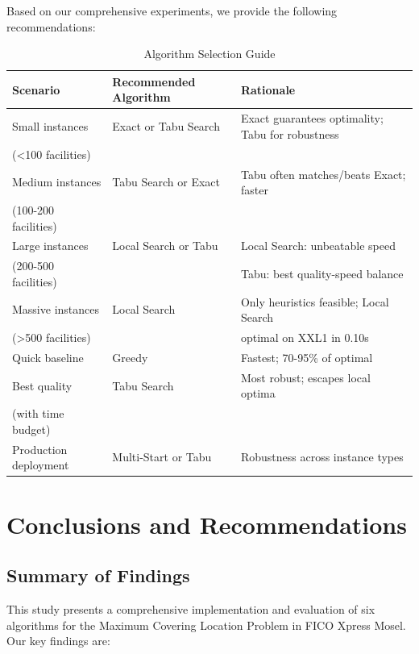 \documentclass[11pt,a4paper]{article}
\begin{document}
Based on our comprehensive experiments, we provide the following recommendations:

\begin{table}[h]
\centering
\caption{Algorithm Selection Guide}
\begin{tabular}{llp{7cm}}
\toprule
\textbf{Scenario} & \textbf{Recommended Algorithm} & \textbf{Rationale} \\
\midrule
Small instances & Exact or Tabu Search & Exact guarantees optimality; Tabu for robustness \\
(\textless100 facilities) & & \\
\midrule
Medium instances & Tabu Search or Exact & Tabu often matches/beats Exact; faster \\
(100-200 facilities) & & \\
\midrule
Large instances & Local Search or Tabu & Local Search: unbeatable speed \\
(200-500 facilities) & & Tabu: best quality-speed balance \\
\midrule
Massive instances & Local Search & Only heuristics feasible; Local Search \\
(\textgreater500 facilities) & & optimal on XXL1 in 0.10s \\
\midrule
Quick baseline & Greedy & Fastest; 70-95\% of optimal \\
\midrule
Best quality & Tabu Search & Most robust; escapes local optima \\
(with time budget) & & \\
\midrule
Production deployment & Multi-Start or Tabu & Robustness across instance types \\
\bottomrule
\end{tabular}
\end{table}

\newpage
\section{Conclusions and Recommendations}

\subsection{Summary of Findings}

This study presents a comprehensive implementation and evaluation of six algorithms for the Maximum Covering Location Problem in FICO Xpress Mosel. Our key findings are:
\end{document}
